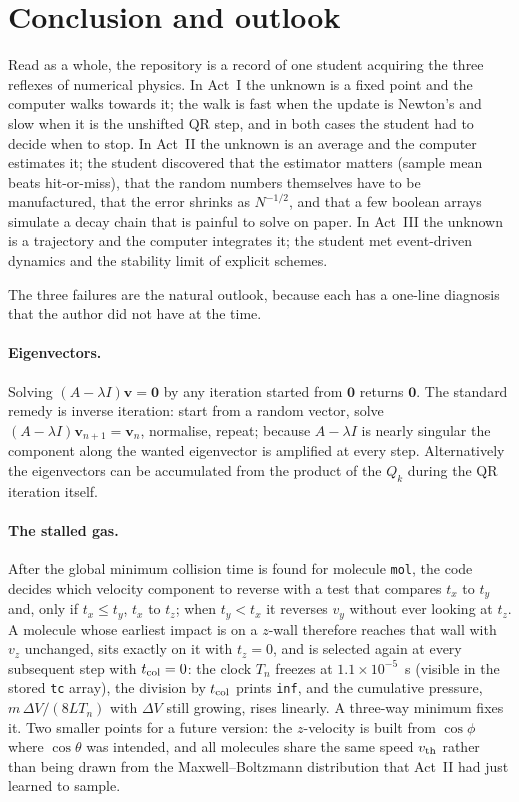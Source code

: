 \documentclass[aps,pra,twocolumn,superscriptaddress,floatfix,nofootinbib]{revtex4-2}
\begin{document}
\section{Conclusion and outlook}
\label{sec:outlook}

Read as a whole, the repository is a record of one student acquiring the three reflexes of numerical physics. In Act~I the unknown is a fixed point and the computer walks towards it; the walk is fast when the update is Newton's and slow when it is the unshifted QR step, and in both cases the student had to decide when to stop. In Act~II the unknown is an average and the computer estimates it; the student discovered that the estimator matters (sample mean beats hit-or-miss), that the random numbers themselves have to be manufactured, that the error shrinks as $N^{-1/2}$, and that a few boolean arrays simulate a decay chain that is painful to solve on paper. In Act~III the unknown is a trajectory and the computer integrates it; the student met event-driven dynamics and the stability limit of explicit schemes.

The three failures are the natural outlook, because each has a one-line diagnosis that the author did not have at the time.

\paragraph{Eigenvectors.} Solving $(A-\lambda I)\mathbf v=\mathbf 0$ by any iteration started from $\mathbf 0$ returns $\mathbf 0$. The standard remedy is inverse iteration: start from a random vector, solve $(A-\lambda I)\mathbf v_{n+1}=\mathbf v_n$, normalise, repeat; because $A-\lambda I$ is nearly singular the component along the wanted eigenvector is amplified at every step. Alternatively the eigenvectors can be accumulated from the product of the $Q_k$ during the QR iteration itself.

\paragraph{The stalled gas.} After the global minimum collision time is found for molecule \texttt{mol}, the code decides which velocity component to reverse with a test that compares $t_x$ to $t_y$ and, only if $t_x\le t_y$, $t_x$ to $t_z$; when $t_y<t_x$ it reverses $v_y$ without ever looking at $t_z$. A molecule whose earliest impact is on a $z$-wall therefore reaches that wall with $v_z$ unchanged, sits exactly on it with $t_z=0$, and is selected again at every subsequent step with $t_{\rm col}=0$: the clock $T_n$ freezes at $1.1\times10^{-5}$~s (visible in the stored \texttt{tc} array), the division by $t_{\rm col}$ prints \texttt{inf}, and the cumulative pressure, $m\,\Delta V/(8LT_n)$ with $\Delta V$ still growing, rises linearly. A three-way minimum fixes it. Two smaller points for a future version: the $z$-velocity is built from $\cos\phi$ where $\cos\theta$ was intended, and all molecules share the same speed $v_{\rm th}$ rather than being drawn from the Maxwell--Boltzmann distribution that Act~II had just learned to sample.
\end{document}
